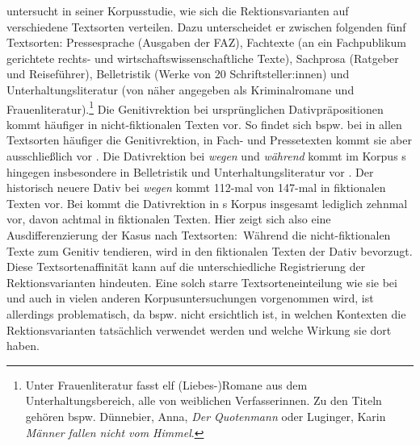 \citet[]{DiMeola2000} untersucht in seiner Korpusstudie, wie sich die Rektionsvarianten auf verschiedene Textsorten verteilen. 
Dazu unterscheidet er zwischen folgenden fünf Textsorten: Pressesprache (Ausgaben der FAZ), Fachtexte (an ein Fachpublikum gerichtete rechts- und wirtschaftswissenschaftliche Texte), Sachprosa (Ratgeber und Reiseführer), Belletristik (Werke von 20 Schriftsteller:innen) und Unterhaltungsliteratur (von \citeauthor{DiMeola2000} näher angegeben als Kriminalromane und Frauenliteratur).\footnote{Unter Frauenliteratur fasst \citet{DiMeola2000} elf (Liebes-)Romane aus dem Unterhaltungsbereich, alle von weiblichen Verfasserinnen. Zu den Titeln gehören bspw. Dünnebier, Anna, \textit{Der Quotenmann} oder Luginger, Karin \textit{Männer fallen nicht vom Himmel}.} 
Die Genitivrektion bei ursprünglichen Dativpräpositionen kommt häufiger in nicht-fiktionalen Texten vor. 
So findet sich bspw. bei \dank{} in allen Textsorten häufiger die Genitivrektion, in Fach- und Pressetexten kommt sie aber ausschließlich vor \citep[s.][212]{DiMeola2000}. 
Die Dativrektion bei \textit{wegen }und \textit{w{\"a}hrend }kommt im Korpus \citeauthor{DiMeola2000}s hingegen insbesondere in Belletristik und Unterhaltungsliteratur vor \citep[s.][210]{DiMeola2000}. 
Der historisch neuere Dativ bei \textit{wegen }kommt 112-mal von 147-mal in fiktionalen Texten vor. 
Bei \waehrend{} kommt die Dativrektion in \citeauthor{DiMeola2000}s Korpus insgesamt lediglich zehnmal vor, davon achtmal in fiktionalen Texten. 
Hier zeigt sich also eine Ausdifferenzierung der Kasus nach Textsorten:~W{\"a}hrend die nicht-fiktionalen Texte zum Genitiv tendieren, wird in den fiktionalen Texten der Dativ bevorzugt.
Diese Textsortenaffinität kann auf die unterschiedliche Registrierung der Rektionsvarianten hindeuten. 
Eine solch starre Textsorteneinteilung wie sie bei \citet{DiMeola2000} und auch in vielen anderen Korpusuntersuchungen vorgenommen wird, ist allerdings problematisch, da bspw. nicht ersichtlich ist, in welchen Kontexten die Rektionsvarianten tatsächlich verwendet werden und welche Wirkung sie dort haben. 


